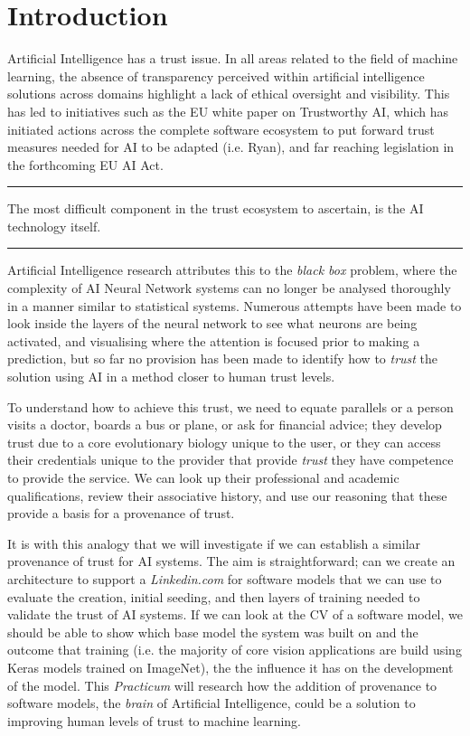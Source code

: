 \section{Introduction}
Artificial Intelligence has a trust issue. In all areas related to the field of machine learning, the absence of transparency perceived within artificial intelligence solutions across domains highlight a lack of ethical oversight and visibility. This has led to initiatives such as the EU white paper on Trustworthy AI\cite{high-levelexpertgrouponaiEthicsGuidelinesTrustworthy2019}, which has initiated actions across the complete software ecosystem to put forward trust measures needed for AI to be adapted (i.e. Ryan\cite{ryanAIWeTrust2020}), and far reaching legislation in the forthcoming EU AI Act.

\noindent\rule[0.5ex]{\linewidth}{1pt}
The most difficult component in the trust ecosystem to ascertain, is the AI technology itself.
\noindent\rule[0.5ex]{\linewidth}{1pt}


Artificial Intelligence research attributes this to the \textit{black box} problem\cite{adadiPeekingBlackBoxSurvey2018}, where the complexity of AI Neural Network systems can no longer be analysed thoroughly in a manner similar to statistical systems. Numerous attempts have been made to look inside the layers of the neural network to see what neurons are being activated\cite{kimInterpretabilityFeatureAttribution2018}, and visualising where the attention is focused prior to making a prediction, but so far no provision has been made to identify how to \textit{trust} the solution using AI in a method closer to human trust levels.

To understand how to achieve this trust, we need to equate parallels or a person visits a doctor, boards a bus or plane, or ask for financial advice; they develop trust due to a core evolutionary biology unique to the user, or they can access their credentials unique to the provider that provide \textit{trust} they have competence to provide the service. We can look up their professional and academic qualifications, review their associative history, and use our reasoning that these provide a basis for a provenance of trust.

It is with this analogy that we will investigate if we can establish a similar provenance of trust for AI systems. The aim is straightforward; can we create an architecture to support a \textit{Linkedin.com} for software models that we can use to evaluate the creation, initial seeding, and then layers of training needed to validate the trust of AI systems. If we can look at the CV of a software model, we should be able to show which base model the system was built on and the outcome that training (i.e. the majority of core vision applications are build using Keras models trained on ImageNet\cite{dengImageNetLargescaleHierarchical2009}), the the influence it has on the development of the model. This \textit{Practicum} will research how the addition of provenance to software models, the \textit{brain} of Artificial Intelligence, could be a solution to improving human levels of trust\cite{mcleodTrust2020} to machine learning.

